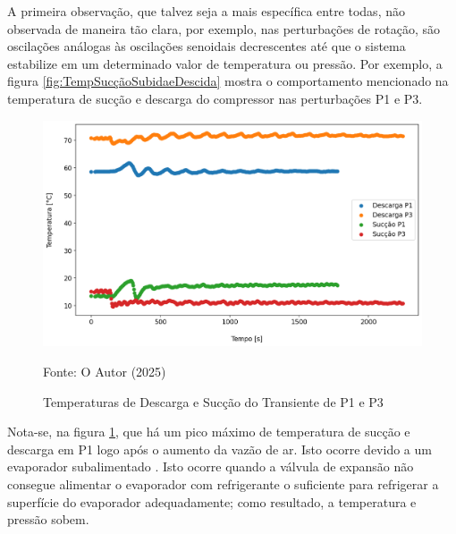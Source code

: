 A primeira observação, que talvez seja a mais específica entre todas, não observada de maneira tão clara, por exemplo, nas perturbações de rotação, são oscilações análogas às oscilações senoidais decrescentes até que o sistema estabilize em um determinado valor de temperatura ou pressão. Por exemplo, a figura \ref{fig:TempSucçãoSubidaeDescida} mostra o comportamento mencionado na temperatura de sucção e descarga do compressor nas perturbações P1 e P3.
\newpage
\begin{figure}[h]
    \centering
    \includegraphics[width=1\linewidth]{FigurasdoTexto/Temperaturas de descarga e sucção Transiente P1 e P3.png}
    \caption{Temperaturas de Descarga e Sucção do Transiente de P1 e P3}
    \label{fig:TempSuccaoPertubacaoVentilador}
    {\footnotesize Fonte: O Autor (2025)}
\end{figure}

Nota-se, na figura \ref{fig:TempSuccaoPertubacaoVentilador}, que há um pico máximo de temperatura de sucção e descarga em P1 logo após o aumento da vazão de ar. Isto ocorre devido a um evaporador subalimentado \cite{StoekerRefrigeration}. Isto ocorre quando a válvula de expansão não consegue alimentar o evaporador com refrigerante o suficiente para refrigerar a superfície do evaporador adequadamente; como resultado, a temperatura e pressão sobem.

